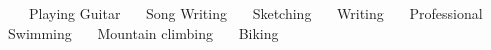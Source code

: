 

\bullet ~~~Playing Guitar
\bullet ~~~Song Writing
\bullet ~~~Sketching
\bullet ~~~Writing
\bullet ~~~Professional Swimming
\bullet ~~~Mountain climbing
\bullet ~~~Biking
\vspace{0.01cm}